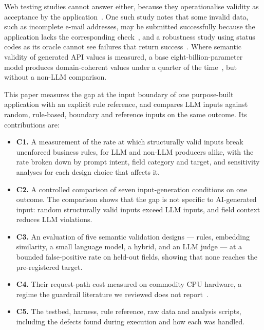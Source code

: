 \documentclass[conference]{IEEEtran}
\begin{document}
Web testing studies cannot answer either, because they operationalise validity as acceptance by the
application~\cite{li2026webformtest,alian2024formnexus}. One such study notes that some invalid
data, such as incomplete e-mail addresses, may be submitted successfully because the application lacks
the corresponding check~\cite{li2026webformtest}, and a robustness study using status codes as its
oracle cannot see failures that return success~\cite{tigulla2026robustness}. Where semantic validity of
generated API values is measured, a base eight-billion-parameter model produces domain-coherent values
under a quarter of the time~\cite{kim2025llamaresttest}, but without a non-LLM comparison.

This paper measures the gap at the input boundary of one purpose-built application with an explicit
rule reference, and compares LLM inputs against random, rule-based, boundary and reference inputs on
the same outcome. Its contributions are:

\begin{itemize}
  \item \textbf{C1.} A measurement of the rate at which structurally valid inputs break unenforced
  business rules, for LLM and non-LLM producers alike, with the rate broken down by prompt intent,
  field category and target, and sensitivity analyses for each design choice that affects it.
  \item \textbf{C2.} A controlled comparison of seven input-generation conditions on one outcome. The
  comparison shows that the gap is not specific to AI-generated input: random
  structurally valid inputs exceed LLM inputs, and field context reduces LLM violations.
  \item \textbf{C3.} An evaluation of five semantic validation designs --- rules, embedding
  similarity, a small language model, a hybrid, and an LLM judge --- at a bounded false-positive rate
  on held-out fields, showing that none reaches the pre-registered target.
  \item \textbf{C4.} Their request-path cost measured on commodity CPU hardware, a regime the guardrail
  literature we reviewed does not report~\cite{jacob2025promptshield,ahmed2026reflexguard,saleem2026layered,wang2026sokguardrails}.
  \item \textbf{C5.} The testbed, harness, rule reference, raw data and analysis scripts, including
  the defects found during execution and how each was handled.
\end{itemize}
\end{document}
